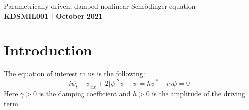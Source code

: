 \documentclass[11pt]{article}
\numberwithin{equation}{section}
\numberwithin{figure}{section}
\numberwithin{table}{section}
\begin{document}
\begin{center}
    {\huge Parametrically driven, damped nonlinear Schr\"odinger equation}\\
    \vspace{0.2in}
    \textbf{KDSMIL001 | October 2021}

    \begin{abstract}
        We find the region of stability for a parametrically driven, damped nonlinear Schr\"odinger equation, find the conditions for an exact soliton solution, and then simulate the equation using the split step Fourier method.
    \end{abstract}
    
\end{center}

\section{Introduction}\label{sec:Introduction}
\par The equation of interest to us is the following:
\begin{equation}
    i\psi_t+\psi_{xx}+2|\psi|^2\psi-\psi=h\psi^*-i\gamma\psi=0
    \label{eqn:original}
\end{equation}
Here $\gamma>0$ is the damping coefficient and $h>0$ is the amplitude of the driving term. 
\end{document}
